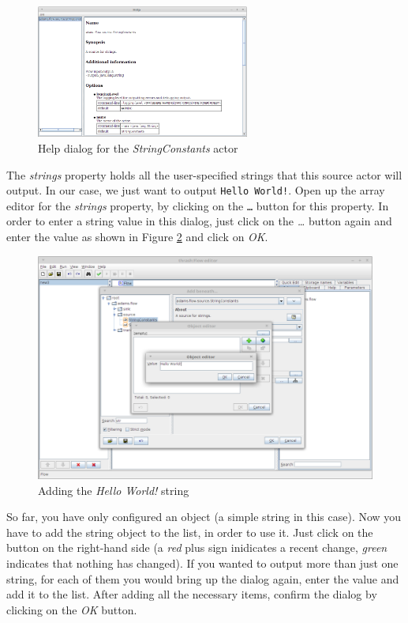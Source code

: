 \begin{figure}[htb]
  \centering
  \includegraphics[width=7.0cm]{images/floweditor-helloworld-actorhelp.png}
  \caption{Help dialog for the \textit{StringConstants} actor}
  \label{floweditor-helloworld-actorhelp}
\end{figure}

The \textit{strings} property holds all the user-specified strings that this
source actor will output. In our case, we just want to output
\texttt{Hello World!}. Open up the array editor for the \textit{strings}
property, by clicking on the \texttt{\ldots} button for this property.
In order to enter a string value in this dialog, just click on the
\textit{\ldots} button again and enter the value as shown in Figure
\ref{floweditor-helloworld-addactor4} and click on \textit{OK}.

\begin{figure}[htb]
  \centering
  \includegraphics[width=12.0cm]{images/floweditor-helloworld-addactor4.png}
  \caption{Adding the \textit{Hello World!} string}
  \label{floweditor-helloworld-addactor4}
\end{figure}

So far, you have only configured an object (a simple string in this case). Now
you have to add the string object to the list, in order to use it. Just click on
the  button on the right-hand side (a
\textit{red} plus sign inidicates a recent change, \textit{green} indicates
that nothing has changed). If you wanted to output more than just one string,
for each of them you would bring up the dialog again, enter the value and add
it to the list. After adding all the necessary items, confirm the dialog by
clicking on the \textit{OK} button.


